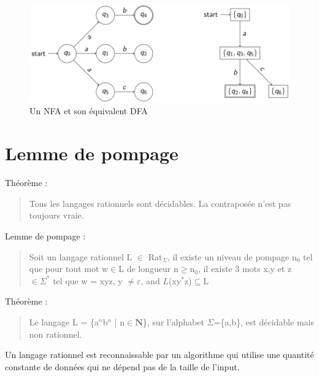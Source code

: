 \documentclass{article}
\begin{document}
\begin{figure}[h]
    \centering
    \includegraphics[scale=0.3]{nfa_dfa.png}
    \caption{Un NFA et son équivalent DFA}
\end{figure}
\newpage



















\section{Lemme de pompage}
Théorème :
\begin{quote}
    Tous les langages rationnels sont décidables. La contraposée n'est pas toujours vraie.
\end{quote}

Lemme de pompage :
\begin{quote}
    Soit un langage rationnel L $\in$ Rat$_{\Sigma}$, il existe un niveau de pompage n$_{0}$ tel que pour tout mot w$\in$L de longueur n$\geq$n$_{0}$, il existe 3 mots x,y et z $\in\Sigma^{*}$ tel que w = xyz, y $\neq\varepsilon$, and $L$(xy$^{*}$z)$\subseteq$L
\end{quote}

Théorème :
\begin{quote}
    Le langage L = \{a$^{n}$b$^{n}$ | n$\in\mathbf{N}$\}, sur l'alphabet $\Sigma$=\{a,b\}, est décidable mais non rationnel.
\end{quote}

Un langage rationnel est reconnaissable par un algorithme qui utilise une quantité constante de données qui  ne dépend pas de la taille de l'input.
\newpage
\end{document}
